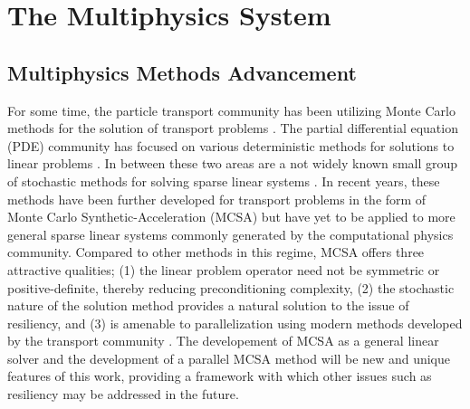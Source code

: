 \section{The Multiphysics System}
\label{sec:multiphysics_system}

\subsection{Multiphysics Methods Advancement}
\label{subsec:methods_advancement}
For some time, the particle transport community has been utilizing
Monte Carlo methods for the solution of transport problems
\citep{lewis_computational_1993}. The partial differential equation
(PDE) community has focused on various deterministic methods for
solutions to linear problems \citep{saad_iterative_2003,
  kelley_iterative_1995}. In between these two areas are a not widely
known small group of stochastic methods for solving sparse linear
systems \citep{forsythe_matrix_1950, hammersley_monte_1964,
  halton_sequential_1962, halton_sequential_1994}. In recent years,
these methods have been further developed for transport problems in
the form of Monte Carlo Synthetic-Acceleration (MCSA)
\citep{evans_residual_2003, evans_monte_2009, evans_monte_2012} but
have yet to be applied to more general sparse linear systems commonly
generated by the computational physics community. Compared to other
methods in this regime, MCSA offers three attractive qualities; (1)
the linear problem operator need not be symmetric or
positive-definite, thereby reducing preconditioning complexity, (2)
the stochastic nature of the solution method provides a natural
solution to the issue of resiliency, and (3) is amenable to
parallelization using modern methods developed by the transport
community \citep{wagner_hybrid_2010}. The developement of MCSA as a
general linear solver and the development of a parallel MCSA method
will be new and unique features of this work, providing a framework
with which other issues such as resiliency may be addressed in the
future.

